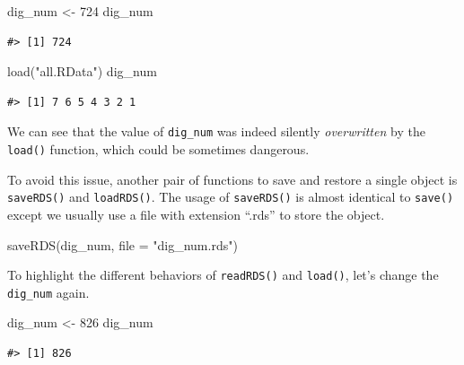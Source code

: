 \documentclass[
]{book}
\newenvironment{Shaded}{\begin{snugshade}}{\end{snugshade}}
\newcommand{\AttributeTok}[1]{\textcolor[rgb]{0.77,0.63,0.00}{#1}}
\newcommand{\DecValTok}[1]{\textcolor[rgb]{0.00,0.00,0.81}{#1}}
\newcommand{\FunctionTok}[1]{\textcolor[rgb]{0.00,0.00,0.00}{#1}}
\newcommand{\NormalTok}[1]{#1}
\newcommand{\OtherTok}[1]{\textcolor[rgb]{0.56,0.35,0.01}{#1}}
\newcommand{\StringTok}[1]{\textcolor[rgb]{0.31,0.60,0.02}{#1}}
\begin{document}
\begin{Shaded}
\begin{Highlighting}[]
\NormalTok{dig\_num }\OtherTok{\textless{}{-}} \DecValTok{724}
\NormalTok{dig\_num}
\end{Highlighting}
\end{Shaded}

\begin{verbatim}
#> [1] 724
\end{verbatim}

\begin{Shaded}
\begin{Highlighting}[]
\FunctionTok{load}\NormalTok{(}\StringTok{"all.RData"}\NormalTok{)}
\NormalTok{dig\_num}
\end{Highlighting}
\end{Shaded}

\begin{verbatim}
#> [1] 7 6 5 4 3 2 1
\end{verbatim}

We can see that the value of \texttt{dig\_num} was indeed silently \emph{overwritten} by the \texttt{load()} function, which could be sometimes dangerous.

To avoid this issue, another pair of functions to save and restore a single object is \texttt{saveRDS()} and \texttt{loadRDS()}. The usage of \texttt{saveRDS()} is almost identical to \texttt{save()} except we usually use a file with extension ``.rds'' to store the object.

\begin{Shaded}
\begin{Highlighting}[]
\FunctionTok{saveRDS}\NormalTok{(dig\_num, }\AttributeTok{file =} \StringTok{"dig\_num.rds"}\NormalTok{)}
\end{Highlighting}
\end{Shaded}

To highlight the different behaviors of \texttt{readRDS()} and \texttt{load()}, let's change the \texttt{dig\_num} again.

\begin{Shaded}
\begin{Highlighting}[]
\NormalTok{dig\_num }\OtherTok{\textless{}{-}} \DecValTok{826}
\NormalTok{dig\_num}
\end{Highlighting}
\end{Shaded}

\begin{verbatim}
#> [1] 826
\end{verbatim}
\end{document}
